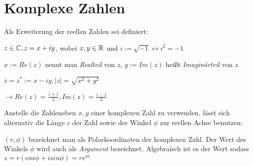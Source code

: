 \section{Komplexe Zahlen}

\begin{definition}
	Als Erweiterung der reellen Zahlen sei definiert:
	\begin{description}[noitemsep]
		\item $z \in \mathbb{C}, z = x + iy$, wobei $x,y \in \mathbb{R}$ und $i := \sqrt{-1} \leftrightarrow i^2 = -1$
		\item $x := Re(z)$ nennt man \emph{Realteil} von $z$, $y := Im(z)$ heißt \emph{Imaginärteil} von $z$
		\item $\bar{z} = z^* := x - iy, |z| = \sqrt{x^2 + y^2}$
		\item $\rightarrow Re(z) = \frac{z + \bar{z}}{2}, Im(z) = \frac{z - \bar{z}}{2}$
	\end{description}
\end{definition}

\begin{definition}[Polardarstellung]
	Anstelle die Zahleneben $x,y$ einer komplexen Zahl zu verwenden, lässt sich alternativ die Länge $c$ der Zahl sowie der Winkel $\phi$ zur reellen Achse benutzen:
	
	
	$(r, \phi) $ bezeichnet man als Polarkoordinaten der komplexen Zahl. Der Wert des Winkels $\phi$ wird auch als \emph{Argument} bezeichnet. Algebraisch ist es der Wert sodass $z = r (cos \phi + i sin \phi) = re^{i\phi}$
	
\end{definition}

